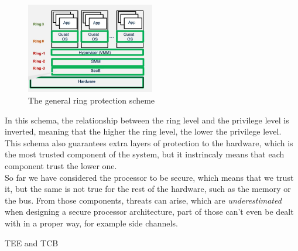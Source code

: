 \begin{figure}[H]
  \centering
  \includegraphics[width=0.5\textwidth]{img/hardware/ring protection scheme.png}
  \caption{The general ring protection scheme}
\end{figure}
In this schema, the relationship between the ring level and the privilege level is inverted, meaning
that the higher the ring level, the lower the privilege level. This schema also guarantees extra
layers of protection to the hardware, which is the most trusted component of the system, but it
instrincaly means that each component trust the lower one.\\
So far we have considered the processor to be secure, which means that we trust it, but the same is
not true for the rest of the hardware, such as the memory or the bus. From those components, threats
can arise, which are \textit{underestimated} when designing a secure processor architecture, part of
those can't even be dealt with in a proper way, for example side channels.
\begin{section}{TEE and TCB}

\end{section}
